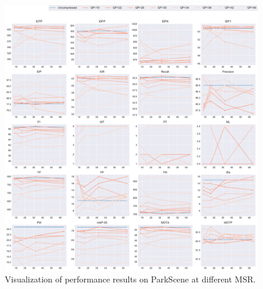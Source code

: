 \begin{figure}[!htbp]
\centering
\includegraphics[width=1.0\linewidth]{img/appendix/ParkScene_all_multiplots_msr.pdf}
\caption[Visualization of performance results on ParkScene at different MSR]
{Visualization of performance results on ParkScene at different MSR.}
\label{fig:ParkScene_all_msr}
\end{figure}



